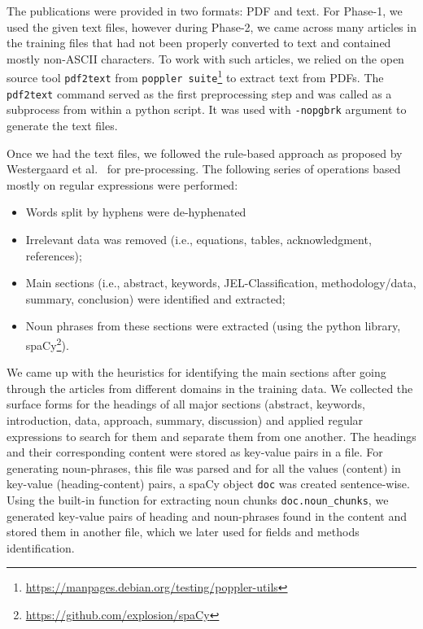\documentclass[runningheads]{llncs}
\begin{document}
The publications were provided in two formats: PDF and text. %
For Phase-1, we used the given text files, however during Phase-2, we came across many articles in the training files that had not been properly converted to text and contained mostly non-ASCII characters. To work with such articles, we relied on the open source tool \texttt{pdf2text} from \texttt{poppler suite}\footnote{\label{poppler}\url{https://manpages.debian.org/testing/poppler-utils}} to extract text from PDFs. The \texttt{pdf2text} command served as the first preprocessing step and was called as a subprocess from within a python script. It was used with \texttt{-nopgbrk} argument to generate the text files.

\smallskip

Once we had the text files, we followed the rule-based approach as proposed by Westergaard et al.~\cite{DBLP:journals/ploscb/WestergaardSTJB18} for pre-processing. The following series of operations based mostly on regular expressions were performed:
\begin{itemize}
    \item Words split by hyphens were de-hyphenated %
    \item Irrelevant data was removed (i.e., equations, tables, acknowledgment, references);
    \item \raggedright Main sections (i.e., abstract, keywords,
    JEL-Classification, methodology/data, summary, conclusion) were identified and extracted;
    \item Noun phrases from these sections were extracted (using the python library, spaCy\footnote{\url{https://github.com/explosion/spaCy}}).
\end{itemize}

We came up with the heuristics for identifying the main sections after going through the articles from different domains in the training data. We collected the surface forms for the headings of all major sections (abstract, keywords, introduction, data, approach, summary, discussion) and applied regular expressions to search for them and separate them from one another. The headings and their corresponding content were stored as key-value pairs in a file. %
For generating noun-phrases, this file was parsed and for all the values (content) in key-value (heading-content) pairs, a spaCy object \texttt{doc} was created sentence-wise. Using the built-in function for extracting noun chunks {\texttt{doc.noun\_chunks}}, we generated key-value pairs of heading and noun-phrases found in the content and stored them in another file, which we later used for fields and methods identification.
\end{document}

